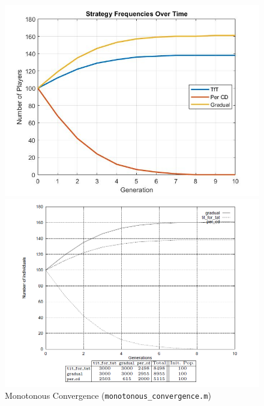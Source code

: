 \begin{figure}[htbp]
  \centering
  \begin{minipage}{0.48\textwidth}
    \centering
\includegraphics[width=0.8\linewidth]{fit_plots_theoretical/monotonous_convergence}

  \end{minipage}
  \hfill
  \begin{minipage}{0.48\textwidth}
    \centering
\includegraphics[width=0.8\linewidth]{monotonous_convergence}

  \end{minipage}\caption{Monotonous Convergence (\texttt{monotonous\_convergence.m})}
\end{figure}

